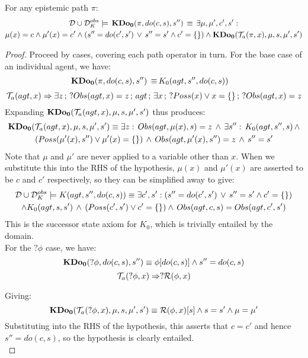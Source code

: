 \begin{lemma}
\label{lem:TrnA_works}For any epistemic path $\pi$:\begin{multline*}
\mathcal{D}\cup\mathcal{D}_{K}^{obs}\models\,\mathbf{KDo_{0}}(\pi,do(c,s),s'')\,\equiv\,\exists\mu,\mu',c',s':\\
\mu(x)=c\wedge\mu'(x)=c'\wedge\left(s''=do(c',s')\,\vee\, s''=s'\wedge c'=\{\}\right)\wedge\mathbf{KDo_{0}}(\mathcal{T}_{a}(\pi,x),\mu,s,\mu',s')\end{multline*}

\end{lemma}
\begin{proof}
Proceed by cases, covering each path operator in turn. For the base
case of an individual agent, we have:\begin{align*}
\mathbf{KDo_{0}}(\pi,do(c,s),s'')\,\equiv\, & K_{0}(agt,s'',do(c,s))\end{align*}
\[
\mathcal{T}_{a}(agt,x)\Rightarrow\exists z\,;\,?Obs(agt,x)=z\,;\, agt\,;\,\exists x\,;\,?Poss(x)\vee x=\{\}\,;\,?Obs(agt,x)=z\]
Expanding $\mathbf{KDo_{0}}(\mathcal{T}_{a}(agt,x),\mu,s,\mu',s')$ thus produces:\begin{multline*}
\mathbf{KDo_{0}}(\mathcal{T}_{a}(agt,x),\mu,s,\mu',s')\equiv\exists z:\, Obs(agt,\mu(x),s)=z\,\wedge\,\exists s'':\, K_{0}(agt,s'',s)\,\wedge\\
\left(Poss(\mu'(x),s'')\vee\mu'(x)=\{\}\right)\,\wedge\, Obs(agt,\mu'(x),s'')=z\,\wedge\, s''=s'\end{multline*}
Note that $\mu$ and $\mu'$ are never applied to a variable other
than $x$. When we substitute this into the RHS of the hypothesis,
$\mu(x)$ and $\mu'(x)$ are asserted to be $c$ and $c'$ respectively,
so they can be simplified away to give:\begin{multline*}
\mathcal{D}\cup\mathcal{D}_{K}^{obs}\models K(agt,s'',do(c,s))\equiv\exists c',s':\left(s''=do(c',s')\,\vee\, s''=s'\wedge c'=\{\}\right)\\
\wedge K_{0}(agt,s,s')\,\wedge\,\left(Poss(c',s')\vee c'=\{\}\right)\wedge\, Obs(agt,c,s)=Obs(agt,c',s')\end{multline*}
This is the successor state axiom for $K_{0}$, which is trivially
entailed by the domain.\\


For the $?\phi$ case, we have:\[
\mathbf{KDo_{0}}(?\phi,do(c,s),s'')\equiv\phi[do(c,s)]\wedge s''=do(c,s)\]
\[
\mathcal{T}_{a}(?\phi,x)\Rightarrow?\mathcal{R}(\phi,x)\]


Giving:\[
\mathbf{KDo_{0}}(\mathcal{T}_{a}(?\phi,x),\mu,s,\mu',s')\equiv\mathcal{R}(\phi,x)[s]\wedge s=s'\wedge\mu=\mu'\]
Substituting into the RHS of the hypothesis, this asserts that $c=c'$
and hence $s''=do(c,s)$, so the hypothesis is clearly entailed.\\



\end{proof}
